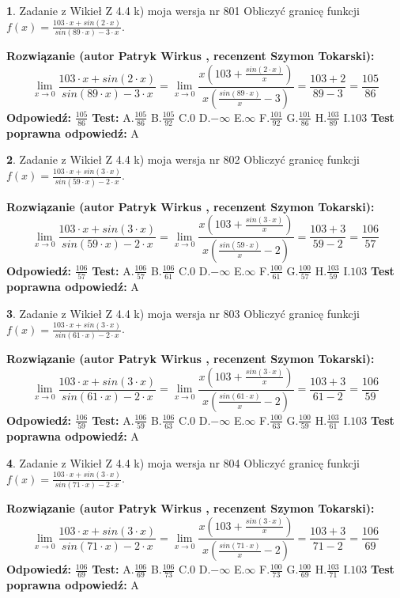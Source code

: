 \documentclass[12pt, a4paper]{article}
\theoremstyle{definition} %
\newtheorem{zad}{}
\newcommand{\zadStart}[1]{\begin{zad}#1\newline}
\newcommand{\zadStop}{\end{zad}}
\newcommand{\rozwStart}[2]{\noindent \textbf{Rozwiązanie (autor #1 , recenzent #2): }\newline}
\newcommand{\rozwStop}{\newline}
\newcommand{\odpStart}{\noindent \textbf{Odpowiedź:}\newline}
\newcommand{\odpStop}{\newline}
\newcommand{\testStart}{\noindent \textbf{Test:}\newline}
\newcommand{\testStop}{\newline}
\newcommand{\kluczStart}{\noindent \textbf{Test poprawna odpowiedź:}\newline}
\newcommand{\kluczStop}{\newline}
\begin{document}
\zadStart{Zadanie z Wikieł Z 4.4 k) moja wersja nr 801}
Obliczyć granicę funkcji $f(x)=\frac{103\cdot x +sin(2\cdot x)}{sin(89\cdot x) -3\cdot x}$.
\zadStop
\rozwStart{Patryk Wirkus}{Szymon Tokarski}
$$\lim\limits_{x\to 0}\frac{103\cdot x +sin(2\cdot x)}{sin(89\cdot x) -3\cdot x}
=\lim\limits_{x\to 0}\frac{x(103+\frac{sin(2\cdot x)}{x})}{x(\frac{sin(89\cdot x)}{x}-3)}
=\frac{103+2}{89-3} = \frac{105}{86}$$
\rozwStop
\odpStart
$\frac{105}{86}$
\odpStop
\testStart
A.$\frac{105}{86}$
B.$\frac{105}{92}$
C.$0$
D.$-\infty$
E.$\infty$
F.$\frac{101}{92}$
G.$\frac{101}{86}$
H.$\frac{103}{89}$
I.$103$
\testStop
\kluczStart
A
\kluczStop



\zadStart{Zadanie z Wikieł Z 4.4 k) moja wersja nr 802}
Obliczyć granicę funkcji $f(x)=\frac{103\cdot x +sin(3\cdot x)}{sin(59\cdot x) -2\cdot x}$.
\zadStop
\rozwStart{Patryk Wirkus}{Szymon Tokarski}
$$\lim\limits_{x\to 0}\frac{103\cdot x +sin(3\cdot x)}{sin(59\cdot x) -2\cdot x}
=\lim\limits_{x\to 0}\frac{x(103+\frac{sin(3\cdot x)}{x})}{x(\frac{sin(59\cdot x)}{x}-2)}
=\frac{103+3}{59-2} = \frac{106}{57}$$
\rozwStop
\odpStart
$\frac{106}{57}$
\odpStop
\testStart
A.$\frac{106}{57}$
B.$\frac{106}{61}$
C.$0$
D.$-\infty$
E.$\infty$
F.$\frac{100}{61}$
G.$\frac{100}{57}$
H.$\frac{103}{59}$
I.$103$
\testStop
\kluczStart
A
\kluczStop



\zadStart{Zadanie z Wikieł Z 4.4 k) moja wersja nr 803}
Obliczyć granicę funkcji $f(x)=\frac{103\cdot x +sin(3\cdot x)}{sin(61\cdot x) -2\cdot x}$.
\zadStop
\rozwStart{Patryk Wirkus}{Szymon Tokarski}
$$\lim\limits_{x\to 0}\frac{103\cdot x +sin(3\cdot x)}{sin(61\cdot x) -2\cdot x}
=\lim\limits_{x\to 0}\frac{x(103+\frac{sin(3\cdot x)}{x})}{x(\frac{sin(61\cdot x)}{x}-2)}
=\frac{103+3}{61-2} = \frac{106}{59}$$
\rozwStop
\odpStart
$\frac{106}{59}$
\odpStop
\testStart
A.$\frac{106}{59}$
B.$\frac{106}{63}$
C.$0$
D.$-\infty$
E.$\infty$
F.$\frac{100}{63}$
G.$\frac{100}{59}$
H.$\frac{103}{61}$
I.$103$
\testStop
\kluczStart
A
\kluczStop



\zadStart{Zadanie z Wikieł Z 4.4 k) moja wersja nr 804}
Obliczyć granicę funkcji $f(x)=\frac{103\cdot x +sin(3\cdot x)}{sin(71\cdot x) -2\cdot x}$.
\zadStop
\rozwStart{Patryk Wirkus}{Szymon Tokarski}
$$\lim\limits_{x\to 0}\frac{103\cdot x +sin(3\cdot x)}{sin(71\cdot x) -2\cdot x}
=\lim\limits_{x\to 0}\frac{x(103+\frac{sin(3\cdot x)}{x})}{x(\frac{sin(71\cdot x)}{x}-2)}
=\frac{103+3}{71-2} = \frac{106}{69}$$
\rozwStop
\odpStart
$\frac{106}{69}$
\odpStop
\testStart
A.$\frac{106}{69}$
B.$\frac{106}{73}$
C.$0$
D.$-\infty$
E.$\infty$
F.$\frac{100}{73}$
G.$\frac{100}{69}$
H.$\frac{103}{71}$
I.$103$
\testStop
\kluczStart
A
\kluczStop
\end{document}
